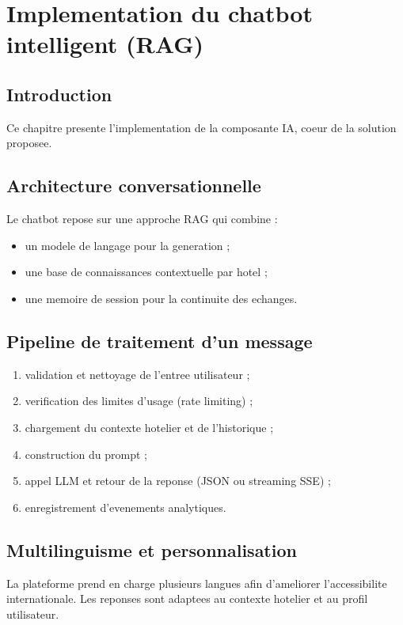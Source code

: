 \chapter{Implementation du chatbot intelligent (RAG)}

\section{Introduction}
Ce chapitre presente l'implementation de la composante IA, coeur de la solution proposee.

\section{Architecture conversationnelle}
Le chatbot repose sur une approche RAG qui combine :
\begin{itemize}
  \item un modele de langage pour la generation ;
  \item une base de connaissances contextuelle par hotel ;
  \item une memoire de session pour la continuite des echanges.
\end{itemize}

\section{Pipeline de traitement d'un message}
\begin{enumerate}
  \item validation et nettoyage de l'entree utilisateur ;
  \item verification des limites d'usage (rate limiting) ;
  \item chargement du contexte hotelier et de l'historique ;
  \item construction du prompt ;
  \item appel LLM et retour de la reponse (JSON ou streaming SSE) ;
  \item enregistrement d'evenements analytiques.
\end{enumerate}

\section{Multilinguisme et personnalisation}
La plateforme prend en charge plusieurs langues afin d'ameliorer l'accessibilite internationale. Les reponses sont adaptees au contexte hotelier et au profil utilisateur.

